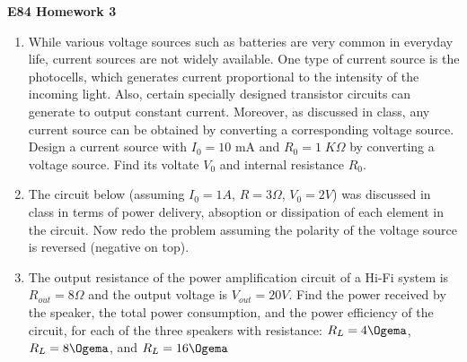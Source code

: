 \usepackage{html}

\begin{center}
{\Large \bf E84 Homework 3}
\end{center}
\begin{enumerate}

\item While various voltage sources such as batteries are very common 
in everyday life, current sources are not widely available. One type of
current source is the photocells, which generates current proportional 
to the intensity of the incoming light. Also, certain specially designed
transistor circuits can generate to output constant current. Moreover, 
as discussed in class, any current source can be obtained by converting
a corresponding voltage source. Design a current source with $I_0=10$ mA 
and $R_0=1\;K\Omega$ by converting a voltage source. Find its voltate 
$V_0$ and internal resistance $R_0$. 


\item The circuit below (assuming $I_0=1A$, $R=3\Omega$, $V_0=2V$) was
discussed in class in terms of power delivery, absoption or dissipation 
of each element in the circuit. Now redo the problem assuming the polarity
of the voltage source is reversed (negative on top). 



\item The output resistance of the power amplification circuit of
  a Hi-Fi system is $R_{out}=8\Omega$ and the output voltage is 
  $V_{out}=20V$. Find the power received by the speaker, the total
  power consumption, and the power efficiency of the circuit, for 
  each of the three speakers with resistance: $R_L=4\Ogema$, 
  $R_L=8\Ogema$, and $R_L=16\Ogema$



\end{enumerate}
